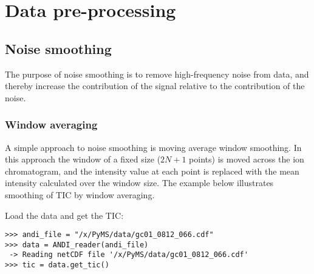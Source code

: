 

\chapter{Data pre-processing}

\section{Noise smoothing}

The purpose of noise smoothing is to remove high-frequency noise from
data, and thereby increase the contribution of the signal relative to
the contribution of the noise.


\subsection{Window averaging}


A simple approach to noise smoothing is moving average window smoothing.
In this approach the window of a fixed size ($2N+1$ points) is moved
across the ion chromatogram, and the intensity value at each point is
replaced with the mean intensity calculated over the window size.
The example below illustrates smoothing of TIC by window averaging.

Load the data and get the TIC:

\begin{verbatim}
>>> andi_file = "/x/PyMS/data/gc01_0812_066.cdf"
>>> data = ANDI_reader(andi_file)
 -> Reading netCDF file '/x/PyMS/data/gc01_0812_066.cdf'
>>> tic = data.get_tic()
\end{verbatim}

